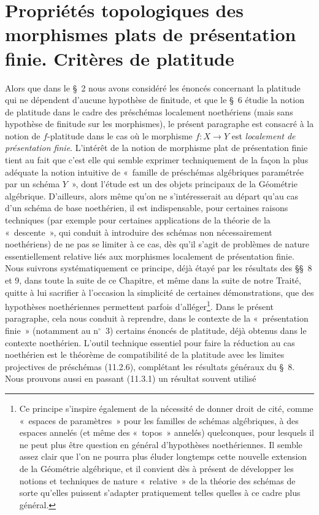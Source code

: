 \section{Propriétés topologiques des morphismes plats de présentation finie. Critères de platitude}
\label{section:IV.11-fr}

Alors que dans le \S~2 nous avons considéré les énoncés concernant la platitude
qui ne dépendent d'aucune hypothèse de finitude, et que le \S~6 étudie la notion
de platitude dans le cadre des préschémas localement noethériens (mais sans
hypothèse de finitude sur les morphismes), le présent paragraphe est consacré à
la notion de $f$-platitude dans le cas où le morphisme $f:X\to Y$ est
\emph{localement de présentation finie}. L'intérêt de la notion de morphisme
plat de présentation finie tient au fait que c'est elle qui semble exprimer
techniquement de la façon la plus adéquate la notion intuitive de «~famille de
préschémas algébriques paramétrée par un schéma $Y$~», dont l'étude est un des
objets principaux de la Géométrie algébrique. D'ailleurs, alors même qu'on ne
s'intéresserait au départ qu'au cas d'un schéma de base noethérien, il est
indispensable, pour certaines raisons techniques (par exemple pour certaines
applications de la théorie de la «~descente~», qui conduit à introduire des
schémas non nécessairement noethériens) de ne pas se limiter à ce cas, dès
qu'il s'agit de problèmes de nature essentiellement relative liés aux
morphismes localement de présentation finie. Nous suivrons systématiquement ce
principe, déjà étayé par les résultats des \S\S~8 et 9, dans toute la suite de ce
Chapitre, et même dans la suite de notre Traité, quitte à lui sacrifier à
l'occasion la simplicité de certaines démonstrations, que des hypothèses
noethériennes permettent parfois d'alléger\footnote{Ce principe s'inspire
également de la nécessité de donner droit de cité, comme «~espaces de
paramètres~» pour les familles de schémas algébriques, à des espaces annelés
(et même des «~topos~» annelés) quelconques, pour lesquels il ne peut plus être
question en général d'hypothèses noethériennes. Il semble assez clair que l'on
ne pourra plus éluder longtemps cette nouvelle extension de la Géométrie
algébrique, et il convient dès à présent de développer les notions et
techniques de nature «~relative~» de la théorie des schémas de sorte qu'elles
puissent s'adapter pratiquement telles quelles à ce cadre plus général.}. Dans
le présent paragraphe, cela nous conduit à reprendre, dans le contexte de la
«~présentation finie~» (notamment au n$^\circ$~3) certains énoncés de platitude,
déjà obtenus dans le contexte noethérien. L'outil technique essentiel pour
faire la réduction au cas noethérien est le théorème de compatibilité de la
platitude avec les limites projectives de préschémas (11.2.6), complétant les
résultats généraux du \S~8. Nous prouvons aussi en passant (11.3.1) un résultat
souvent utilisé

